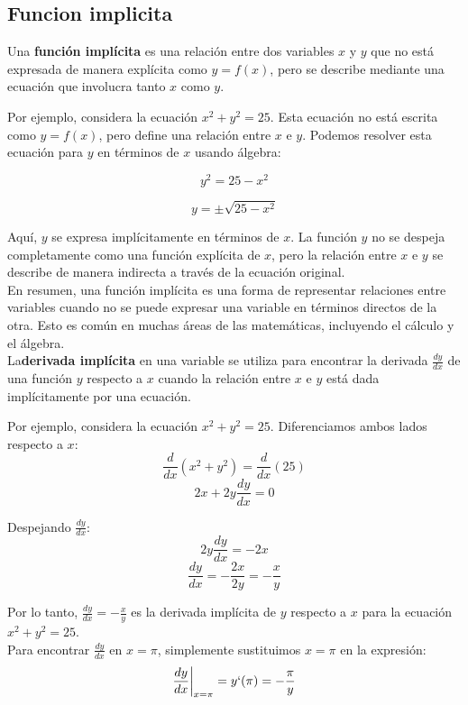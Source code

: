 \documentclass[12pt]{article}
\begin{document}
{\subsection{ Funcion implicita}
Una \textbf{función implícita} es una relación entre dos variables \( x \) y \( y \) que no está expresada de manera explícita como \( y = f(x) \), pero se describe mediante una ecuación que involucra tanto \( x \) como \( y \).

Por ejemplo, considera la ecuación \( x^2 + y^2 = 25 \). Esta ecuación no está escrita como \( y = f(x) \), pero define una relación entre \( x \) e \( y \). Podemos resolver esta ecuación para \( y \) en términos de \( x \) usando álgebra:

\[
y^2 = 25 - x^2
\]

\[
y = \pm \sqrt{25 - x^2}
\]

Aquí, \( y \) se expresa implícitamente en términos de \( x \). La función \( y \) no se despeja completamente como una función explícita de \( x \), pero la relación entre \( x \) e \( y \) se describe de manera indirecta a través de la ecuación original.\\

En resumen, una función implícita es una forma de representar relaciones entre variables cuando no se puede expresar una variable en términos directos de la otra. Esto es común en muchas áreas de las matemáticas, incluyendo el cálculo y el álgebra.\\



La\textbf{derivada implícita} en una variable se utiliza para encontrar la derivada \( \frac{dy}{dx} \) de una función \( y \) respecto a \( x \) cuando la relación entre \( x \) e \( y \) está dada implícitamente por una ecuación.

Por ejemplo, considera la ecuación \( x^2 + y^2 = 25 \). Diferenciamos ambos lados respecto a \( x \):
\[ \frac{d}{dx} (x^2 + y^2) = \frac{d}{dx} (25) \]
\[ 2x + 2y \frac{dy}{dx} = 0 \]

Despejando \( \frac{dy}{dx} \):
\[ 2y \frac{dy}{dx} = -2x \]
\[ \frac{dy}{dx} = -\frac{2x}{2y} = -\frac{x}{y} \]

Por lo tanto, \( \frac{dy}{dx} = -\frac{x}{y} \) es la derivada implícita de \( y \) respecto a \( x \) para la ecuación \( x^2 + y^2 = 25 \).\\ 

Para encontrar \( \frac{dy}{dx} \) en \( x = \pi \), simplemente sustituimos \( x = \pi \) en la expresión:
\[ \frac{dy}{dx} \bigg|_{x = \pi}=y`(\pi) = -\frac{\pi}{y} \]

}
\end{document}

